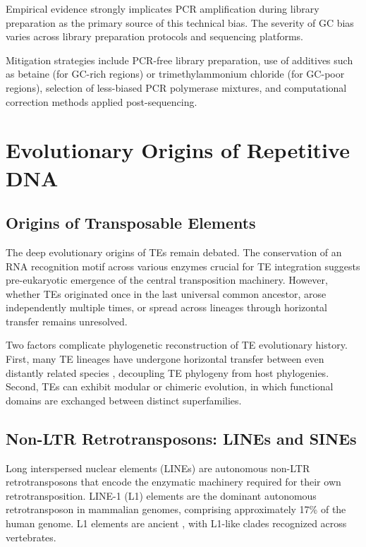 Empirical evidence strongly implicates PCR amplification during library preparation as the primary source of this technical bias. The severity of GC bias varies across library preparation protocols and sequencing platforms.

Mitigation strategies include PCR-free library preparation, use of additives such as betaine (for GC-rich regions) or trimethylammonium chloride (for GC-poor regions), selection of less-biased PCR polymerase mixtures, and computational correction methods applied post-sequencing.

\section{Evolutionary Origins of Repetitive DNA}

\subsection{Origins of Transposable Elements}

The deep evolutionary origins of TEs remain debated. The conservation of an RNA recognition motif across various enzymes crucial for TE integration suggests pre-eukaryotic emergence of the central transposition machinery. However, whether TEs originated once in the last universal common ancestor, arose independently multiple times, or spread across lineages through horizontal transfer remains unresolved.

Two factors complicate phylogenetic reconstruction of TE evolutionary history. First, many TE lineages have undergone horizontal transfer between even distantly related species \parencite{schaack2010}, decoupling TE phylogeny from host phylogenies. Second, TEs can exhibit modular or chimeric evolution, in which functional domains are exchanged between distinct superfamilies.

\subsection{Non-LTR Retrotransposons: LINEs and SINEs}

Long interspersed nuclear elements (LINEs) are autonomous non-LTR retrotransposons that encode the enzymatic machinery required for their own retrotransposition. LINE-1 (L1) elements are the dominant autonomous retrotransposon in mammalian genomes, comprising approximately 17\% of the human genome. L1 elements are ancient \parencite{malik2001}, with L1-like clades recognized across vertebrates.

